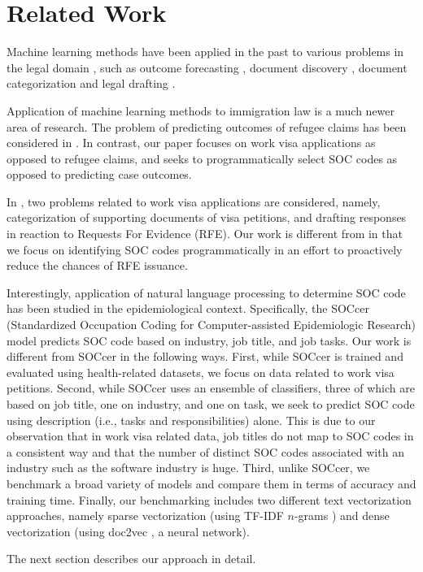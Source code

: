 \section{Related Work}
\label{sec:RelatedWork}

Machine learning methods have been applied in the past to various problems in the legal domain \cite{Surden2014,10.1007/978-3-030-19823-7_31,Faggella2020}, such as outcome forecasting \cite{10.2307/4099370,10.2307/3688543,Katz2016,Aletras2016PredictingJD,Medvedeva2019UsingML}, document discovery \cite{DBLP:conf/icail/YangGFY17,Cormack2014EvaluationOM}, document categorization \cite{Lemley2007,DBLP:conf/bigdataconf/WeiQYZ18,Silva2018DocumentTC,DBLP:conf/fedcsis/UndaviaMO18,DBLP:conf/cikm/LuCAK11,DBLP:conf/propor/FurquimL12,Kumar2012}
and legal drafting \cite{DBLP:conf/afips/SprowlBCEK84,Betts2017,Miller}.

Application of machine learning methods to immigration law is a much newer area of research. The problem of predicting outcomes of refugee claims has been considered in \cite{DBLP:conf/icail/DunnSSC17,DBLP:conf/icail/ChenE17}. In contrast, our paper focuses on work visa applications as opposed to refugee claims, and seeks to programmatically select SOC codes as opposed to predicting case outcomes.

In \cite{DBLP:conf/icdm/MukherjeeODJAWH20}, two problems related to work visa applications are considered, namely, categorization of supporting documents of visa petitions, and drafting responses in reaction to Requests For Evidence (RFE). Our work is different from \cite{DBLP:conf/icdm/MukherjeeODJAWH20} in that we focus on identifying SOC codes programmatically in an effort to proactively reduce the chances of RFE issuance.

Interestingly, application of natural language processing to determine SOC code has been studied in the epidemiological context. Specifically, the SOCcer (Standardized Occupation Coding for Computer-assisted Epidemiologic Research) model \cite{pmid27102331} predicts SOC code based on industry, job title, and job tasks. Our work is different from SOCcer in the following ways. First, while SOCcer is trained and evaluated using health-related datasets, we focus on data related to work visa petitions. Second, while SOCcer uses an ensemble of classifiers, three of which are based on job title, one on industry, and one on task, we seek to predict SOC code using description (i.e., tasks and responsibilities) alone. This is due to our observation that in work visa related data, job titles do not map to SOC codes in a consistent way and that the number of distinct SOC codes associated with an industry such as the software industry is huge. Third, unlike SOCcer, we benchmark a broad variety of models and compare them in terms of accuracy and training time. Finally, our benchmarking includes two different text vectorization approaches, namely sparse vectorization (using TF-IDF $n$-grams  \cite{DBLP:conf/ecml/Joachims98}) and dense vectorization (using doc2vec \cite{DBLP:conf/icml/LeM14}, a neural network).     

The next section describes our approach in detail.









